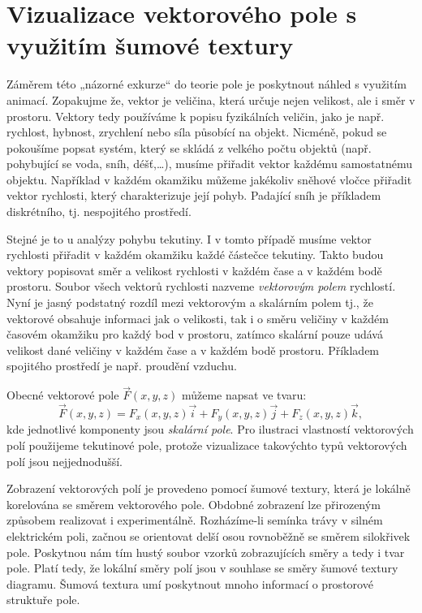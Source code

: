   \tikzexternaldisable
  \section{Vizualizace vektorového pole s využitím šumové textury}
    Záměrem této „názorné exkurze“ do teorie pole je poskytnout náhled s využitím animací. 
    Zopakujme že, vektor je veličina, která určuje nejen velikost, ale i směr v prostoru. Vektory 
    tedy používáme k popisu fyzikálních veličin, jako je např. rychlost, hybnost, zrychlení nebo 
    síla působící na objekt. Nicméně, pokud se pokoušíme popsat systém, který se skládá z velkého 
    počtu objektů (např. pohybující se voda, sníh, déšť,…), musíme přiřadit vektor každému 
    samostatnému objektu. Například v každém okamžiku můžeme jakékoliv sněhové vločce přiřadit 
    vektor rychlosti, který charakterizuje její pohyb. Padající sníh je příkladem diskrétního, tj. 
    nespojitého prostředí.    
    
    Stejné je to u analýzy pohybu tekutiny. I v tomto případě musíme vektor rychlosti přiřadit v 
    každém okamžiku každé částečce tekutiny. Takto budou vektory popisovat směr a velikost 
    rychlosti v každém čase a v každém bodě prostoru. Soubor všech vektorů rychlosti nazveme 
    \emph{vektorovým polem} rychlostí. Nyní je jasný podstatný rozdíl mezi vektorovým a skalárním 
    polem tj., že vektorové obsahuje informaci jak o velikosti, tak i o směru veličiny v každém 
    časovém okamžiku pro každý bod v prostoru, zatímco skalární pouze udává velikost dané veličiny 
    v každém čase a v každém bodě prostoru. Příkladem spojitého prostředí je např. proudění vzduchu.
    
    Obecné vektorové pole \(\vec{F}(x, y, z)\) můžeme napsat ve tvaru:
    \begin{equation}
     \vec{F}(x,y,z) = F_x(x,y,z)\vec{i} + F_y(x,y,z)\vec{j} + F_z(x,y,z)\vec{k},
    \end{equation} 
    kde jednotlivé komponenty jsou \emph{skalární pole}. Pro ilustraci vlastností vektorových polí 
    použijeme tekutinové pole, protože vizualizace takovýchto typů vektorových polí jsou 
    nejjednodušší.  
    
    Zobrazení vektorových polí je provedeno pomocí šumové textury, která je lokálně korelována se 
    směrem vektorového pole. Obdobné zobrazení lze přirozeným způsobem realizovat i experimentálně. 
    Rozházíme-li semínka trávy v silném elektrickém poli, začnou se orientovat delší osou 
    rovnoběžně se směrem silokřivek pole. Poskytnou nám tím hustý soubor vzorků zobrazujících směry 
    a tedy i tvar pole. Platí tedy, že lokální směry polí jsou v souhlase se směry šumové textury 
    diagramu. Šumová textura umí poskytnout mnoho informací o prostorové struktuře pole.

